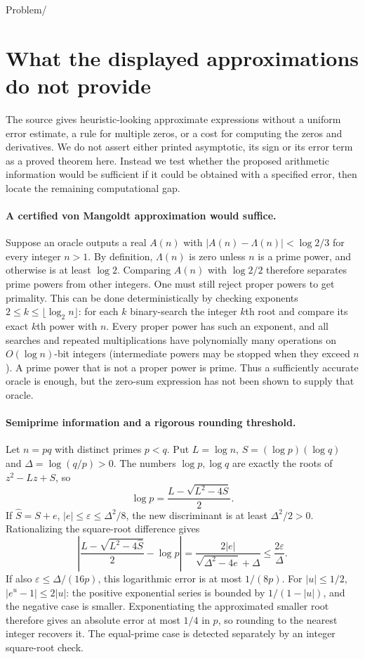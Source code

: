\documentclass[11pt]{article}
\begin{document}
Problem/

\section{What the displayed approximations do not provide}
The source gives heuristic-looking approximate expressions without a
uniform error estimate, a rule for multiple zeros, or a cost for
computing the zeros and derivatives. We do not assert either printed
asymptotic, its sign or its error term as a proved theorem here.
Instead we test whether the proposed arithmetic information would be
sufficient if it could be obtained with a specified error, then locate
the remaining computational gap.

\paragraph{A certified von Mangoldt approximation would suffice.}
Suppose an oracle outputs a real $A(n)$ with
$|A(n)-\Lambda(n)|<\log2/3$ for every integer $n>1$.
By definition, $\Lambda(n)$ is zero unless $n$ is a prime power,
and otherwise is at least $\log2$. Comparing $A(n)$ with
$\log2/2$ therefore separates prime powers from other integers.
One must still reject proper powers to get primality. This can be done
deterministically by checking exponents $2\le k\le\lfloor\log_2n\rfloor$:
for each $k$ binary-search the integer $k$th root and compare its
exact $k$th power with $n$. Every proper power has such an exponent,
and all searches and repeated multiplications have polynomially many
operations on $O(\log n)$-bit integers (intermediate powers may be
stopped when they exceed $n$). A prime power that is not a proper
power is prime. Thus a sufficiently accurate oracle is enough, but
the zero-sum expression has not been shown to supply that oracle.

\paragraph{Semiprime information and a rigorous rounding threshold.}
Let $n=pq$ with distinct primes $p<q$. Put
$L=\log n$, $S=(\log p)(\log q)$ and
$\Delta=\log(q/p)>0$. The numbers $\log p,\log q$ are exactly the
roots of $z^2-Lz+S$, so
\[
\log p=\frac{L-\sqrt{L^2-4S}}2.
\]
If $\widehat S=S+e$, $|e|\le\varepsilon\le\Delta^2/8$, the
new discriminant is at least $\Delta^2/2>0$. Rationalizing the
square-root difference gives
\[
\left|\frac{L-\sqrt{L^2-4\widehat S}}2-\log p\right|
=\frac{2|e|}{\sqrt{\Delta^2-4e}+\Delta}
\le\frac{2\varepsilon}{\Delta}.
\]
If also $\varepsilon\le\Delta/(16p)$, this logarithmic error is
at most $1/(8p)$. For $|u|\le1/2$,
$|e^u-1|\le2|u|$: the positive exponential series is bounded by
$1/(1-|u|)$, and the negative case is smaller. Exponentiating the
approximated smaller root therefore gives an absolute error at most
$1/4$ in $p$, so rounding to the nearest integer recovers it.
The equal-prime case is detected separately by an integer square-root
check.
\end{document}
